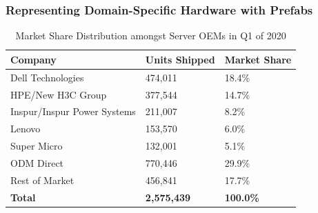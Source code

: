 \documentclass[11pt]{article}
\begin{document}
		\subsubsection{Representing Domain-Specific Hardware with Prefabs}
			\begin{table}[]
			\centering
				\begin{tabular}{lll}
				\toprule
				Company                     & Units Shipped      & Market Share     \\ \midrule
				\rowcolor[HTML]{9AFF99} 
				Dell Technologies           & 474,011            & 18.4\%           \\
				\rowcolor[HTML]{9AFF99} 
				HPE/New H3C Group           & 377,544            & 14.7\%           \\
				\rowcolor[HTML]{9AFF99} 
				Inspur/Inspur Power Systems & 211,007            & 8.2\%            \\
				Lenovo                      & 153,570            & 6.0\%            \\
				Super Micro                 & 132,001            & 5.1\%            \\
				ODM Direct                  & 770,446            & 29.9\%           \\
				Rest of Market              & 456,841            & 17.7\%           \\ \midrule
				\textbf{Total}              & \textbf{2,575,439} & \textbf{100.0\%} \\ \bottomrule
				\end{tabular}
			\caption{Market Share Distribution amongst Server OEMs in Q1 of 2020}
			\label{tab:1}
			\end{table}
\end{document}
